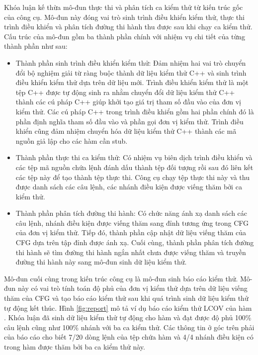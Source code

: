 Khóa luận kế thừa mô-đun thực thi và phân tích ca kiểm thử từ kiến trúc gốc của công cụ. Mô-đun này đóng vai trò  sinh trình điều khiển kiểm thử, thực thi trình điều khiển và phân tích đường thi hành thu được sau khi chạy ca kiểm thử. Cấu trúc của mô-đun gồm ba thành phần chính với nhiệm vụ chi tiết của từng thành phần như sau:
\begin{itemize}
    \item Thành phần sinh trình điều khiển kiểm thử: Đảm nhiệm hai vai trò chuyển đổi bộ nghiệm giải từ ràng buộc thành dữ liệu kiểm thử C++ và sinh trình điều khiển kiểm thử dựa trên dữ liệu mới. Trình điều khiển kiểm thử là một tệp C++ được tự động sinh ra nhằm chuyển đổi dữ liệu kiểm thử C++ thành các cú pháp C++ giúp khởi tạo giá trị tham số đầu vào của đơn vị kiểm thử. Các cú pháp C++ trong trình điều khiển gồm hai phần chính đó là phần định nghĩa tham số đầu vào và phần gọi đơn vị kiểm thử. Trình điều khiển cũng đảm nhiệm chuyển hóa dữ liệu kiểm thử C++ thành các mã nguồn giả lập cho các hàm cần stub.
    \item Thành phần thực thi ca kiểm thử: Có nhiệm vụ biên dịch trình điều khiển và các tệp mã nguồn chứa lệnh đánh dấu thành tệp đối tượng rồi sau đó liên kết các tệp này để tạo thành tệp thực thi. Công cụ chạy tệp thực thi này và thu được danh sách các câu lệnh, các nhánh điều kiện được viếng thăm bởi ca kiểm thử.
    \item Thành phần phân tích đường thi hành: Có chức năng ánh xạ danh sách các câu lệnh, nhánh điều kiện được viếng thăm sang đỉnh tương ứng trong CFG của đơn vị kiểm thử. Tiếp đó, thành phần cập nhật dữ liệu viếng thăm của CFG dựa trên tập đỉnh được ánh xạ. Cuối cùng, thành phần phân tích đường thi hành sẽ tìm đường thi hành ngắn nhất chưa được viếng thăm và truyền đường thi hành này sang mô-đun sinh dữ liệu kiểm thử.
\end{itemize}

Mô-đun cuối cùng trong kiến trúc công cụ là mô-đun sinh báo cáo kiểm thử. Mô-đun này có vai trò tính toán độ phủ của đơn vị kiểm thử dựa trên dữ liệu viếng thăm của CFG và tạo báo cáo kiểm thử sau khi quá trình sinh dữ liệu kiểm thử tự động kết thúc. Hình \ref{fig:report} mô tả ví dụ báo cáo kiểm thử LCOV của hàm . Khóa luận đã sinh dữ liệu kiểm thử tự động cho hàm  và đạt được độ phủ 100\% câu lệnh cũng như 100\% nhánh với ba ca kiểm thử. Các thông tin ở góc trên phải của báo cáo cho biết 7/20 dòng lệnh của tệp chứa hàm  và 4/4 nhánh điều kiện có trong hàm được thăm bởi ba ca kiểm thử này. 

